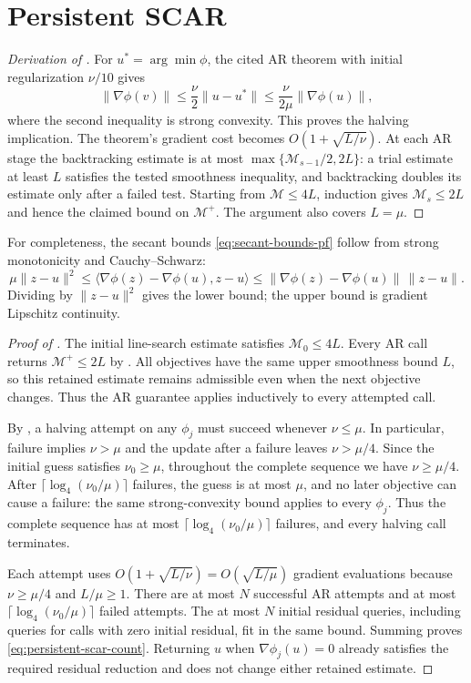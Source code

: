 \documentclass{article}
\begin{document}
\section{Persistent SCAR}
\label{app:scar-tool-proof}

\begin{proof}[Derivation of ]
For $u^*=\arg\min\phi$, the cited AR theorem with initial
regularization $\nu/10$ gives
\[
 \|\nabla\phi(v)\|\le\frac\nu2\|u-u^*\|
 \le\frac\nu{2\mu}\|\nabla\phi(u)\|,
\]
where the second inequality is strong convexity.  This proves the
halving implication.  The theorem's gradient cost becomes
$O(1+\sqrt{L/\nu})$.  At each AR stage the backtracking estimate is
at most $\max\{\mathcal M_{s-1}/2,2L\}$: a trial estimate at least
$L$ satisfies the tested smoothness inequality, and backtracking
doubles its estimate only after a failed test.  Starting from
$\mathcal M\le4L$, induction gives $\mathcal M_s\le2L$ and hence
the claimed bound on $\mathcal M^+$.  The argument also covers
$L=\mu$.
\end{proof}

For completeness, the secant bounds \eqref{eq:secant-bounds-pf} follow
from strong monotonicity and Cauchy--Schwarz:
\[
 \mu\|z-u\|^2
 \le\langle\nabla\phi(z)-\nabla\phi(u),z-u\rangle
 \le\|\nabla\phi(z)-\nabla\phi(u)\|\,\|z-u\|.
\]
Dividing by $\|z-u\|^2$ gives the lower bound; the upper bound is
gradient Lipschitz continuity.

\begin{proof}[Proof of ]
The initial line-search estimate satisfies $\mathcal M_0\le4L$.
Every AR call returns $\mathcal M^+\le2L$ by
.  All objectives have the same upper
smoothness bound $L$, so this retained estimate remains admissible
even when the next objective changes.  Thus the AR guarantee applies
inductively to every attempted call.

By , a halving attempt on any $\phi_j$
must succeed whenever $\nu\le\mu$.
In particular, failure implies $\nu>\mu$ and the update after a
failure leaves $\nu>\mu/4$.  Since the initial guess satisfies
$\nu_0\ge\mu$, throughout the complete sequence we have
$\nu\ge\mu/4$.  After
$\lceil\log_4(\nu_0/\mu)\rceil$ failures, the guess is at most
$\mu$, and no later objective can cause a failure: the same
strong-convexity bound applies to every $\phi_j$.  Thus the complete
sequence has at most $\lceil\log_4(\nu_0/\mu)\rceil$ failures,
and every halving call terminates.

Each attempt uses $O(1+\sqrt{L/\nu})=O(\sqrt{L/\mu})$ gradient
evaluations because $\nu\ge\mu/4$ and $L/\mu\ge1$.
There are at most $N$ successful AR attempts and at most
$\lceil\log_4(\nu_0/\mu)\rceil$ failed attempts.
The at most $N$ initial residual queries, including queries for calls
with zero initial residual, fit in the same bound.  Summing proves
\eqref{eq:persistent-scar-count}.  Returning $u$ when
$\nabla\phi_j(u)=0$ already satisfies the required residual reduction
and does not change either retained estimate.
\end{proof}
\end{document}
